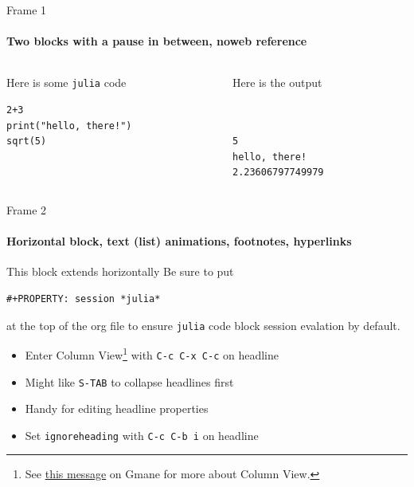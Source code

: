 \documentclass[presentation]{beamer}
\begin{document}
\begin{frame}[fragile,label=sec-1-2]{Frame 1}
 \framesubtitle{Two blocks with a pause in between, noweb reference}
\begin{columns}
\begin{column}{0.5\textwidth}
\begin{block}{Here is some \texttt{julia} code}

\label{simple-code}
\begin{verbatim}
2+3
print("hello, there!")
sqrt(5)
\end{verbatim}

\pause
\end{block}
\end{column}
\begin{column}{0.5\textwidth}
\begin{block}{Here is the output}

\begin{verbatim}


5
hello, there!
2.23606797749979
\end{verbatim}
\end{block}
\end{column}
\end{columns}
\end{frame}
\begin{frame}[fragile,label=sec-1-3]{Frame 2}
 \framesubtitle{Horizontal block, text (list) animations, footnotes, hyperlinks}

\begin{block}{This block extends horizontally}
Be sure to put 

\begin{verbatim}
#+PROPERTY: session *julia*
\end{verbatim}

at the top of the org file to ensure \texttt{julia} code block session evalation by default.
\end{block}
\begin{itemize}[<+->]
\item Enter Column View\footnote{See \href{http://thread.gmane.org/gmane.emacs.orgmode/5107/focus=5134}{this message} on Gmane for more about Column View.} with \texttt{C-c C-x C-c} on headline
\item Might like \texttt{S-TAB} to collapse headlines first
\item Handy for editing headline properties
\item Set \texttt{ignoreheading} with \texttt{C-c C-b i} on headline
\end{itemize}
\end{frame}
\end{document}
